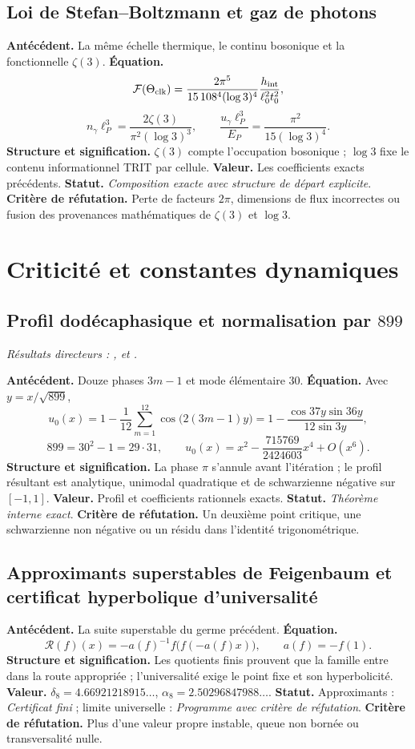 \subsection*{Loi de Stefan--Boltzmann et gaz de photons }
\textbf{Antécédent.} La même échelle thermique, le continu bosonique et la
fonctionnelle \(\zeta(3)\). \textbf{Équation.}
\[
\mathcal F(\Theta_{\rm clk})
=\frac{2\pi^5}{15\,108^4(\log3)^4}
\frac{h_{\rm int}}{\ell_0^2t_0^2},
\]
\[
n_\gamma\ell_P^3=\frac{2\zeta(3)}{\pi^2(\log3)^3},
\qquad
\frac{u_\gamma\ell_P^3}{E_P}=\frac{\pi^2}{15(\log3)^4}.
\]
\textbf{Structure et signification.} \(\zeta(3)\) compte l'occupation bosonique ;
\(\log3\) fixe le contenu informationnel TRIT par cellule. \textbf{Valeur.}
Les coefficients
exacts précédents. \textbf{Statut.} \emph{Composition exacte avec
structure de départ explicite}. \textbf{Critère de réfutation.} Perte de facteurs
\(2\pi\), dimensions de flux incorrectes ou fusion des provenances mathématiques de
\(\zeta(3)\) et \(\log3\).

\section{Criticité et constantes dynamiques}

\subsection*{Profil dodécaphasique et normalisation par \(899\)}
\noindent\textit{Résultats directeurs : , et
.}\par
\textbf{Antécédent.} Douze phases \(3m-1\) et mode élémentaire \(30\).
\textbf{Équation.} Avec \(y=x/\sqrt{899}\),
\[
u_0(x)=1-\frac1{12}\sum_{m=1}^{12}
\cos\!\bigl(2(3m-1)y\bigr)
=1-\frac{\cos37y\sin36y}{12\sin3y},
\]
\[
899=30^2-1=29\cdot31,\qquad
u_0(x)=x^2-\frac{715769}{2424603}x^4+O(x^6).
\]
\textbf{Structure et signification.} La phase \(\pi\) s'annule avant
l'itération ; le profil résultant est analytique, unimodal quadratique et de
schwarzienne négative sur \([-1,1]\). \textbf{Valeur.} Profil et coefficients
rationnels exacts. \textbf{Statut.} \emph{Théorème interne exact}.
\textbf{Critère de réfutation.} Un deuxième point critique, une schwarzienne non négative ou un
résidu dans l'identité trigonométrique.

\subsection*{Approximants superstables de Feigenbaum et certificat hyperbolique d'universalité}
\textbf{Antécédent.} La suite superstable du germe précédent.
\textbf{Équation.}
\[
\mathcal R(f)(x)=-a(f)^{-1}f\bigl(f(-a(f)x)\bigr),
\qquad a(f)=-f(1).
\]
\textbf{Structure et signification.} Les quotients finis prouvent que la
famille entre dans la route appropriée ; l'universalité exige le point fixe et
son hyperbolicité. \textbf{Valeur.}
\(\delta_8=4.66921218915\ldots\),
\(\alpha_8=2.50296847988\ldots\). \textbf{Statut.} Approximants :
\emph{Certificat fini} ; limite universelle : \emph{Programme avec
critère de réfutation}. \textbf{Critère de réfutation.} Plus d'une valeur propre instable, queue non bornée
ou transversalité nulle.

